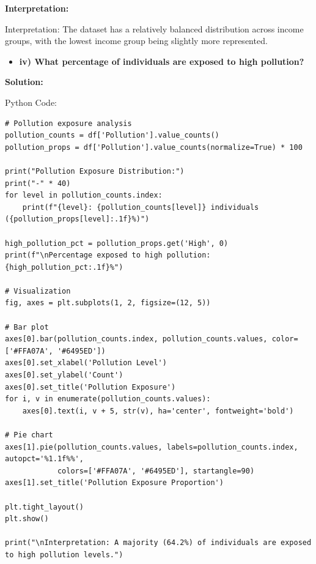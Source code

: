 \documentclass[12pt]{article}
\begin{document}
\vspace{0.3cm}

\textbf{Interpretation:}

Interpretation: The dataset has a relatively balanced distribution across income groups, with the lowest income group being slightly more represented.

\begin{itemize}
    \item\textbf{iv) What percentage of individuals are exposed to high pollution?}
\end{itemize}

{\large\textbf{Solution:}}\\

\vspace{0.1cm}

{\large{Python Code:}}

\vspace{0.2cm}

\begin{verbatim}
# Pollution exposure analysis
pollution_counts = df['Pollution'].value_counts()
pollution_props = df['Pollution'].value_counts(normalize=True) * 100

print("Pollution Exposure Distribution:")
print("-" * 40)
for level in pollution_counts.index:
    print(f"{level}: {pollution_counts[level]} individuals ({pollution_props[level]:.1f}%)")

high_pollution_pct = pollution_props.get('High', 0)
print(f"\nPercentage exposed to high pollution: {high_pollution_pct:.1f}%")

# Visualization
fig, axes = plt.subplots(1, 2, figsize=(12, 5))

# Bar plot
axes[0].bar(pollution_counts.index, pollution_counts.values, color=['#FFA07A', '#6495ED'])
axes[0].set_xlabel('Pollution Level')
axes[0].set_ylabel('Count')
axes[0].set_title('Pollution Exposure')
for i, v in enumerate(pollution_counts.values):
    axes[0].text(i, v + 5, str(v), ha='center', fontweight='bold')

# Pie chart
axes[1].pie(pollution_counts.values, labels=pollution_counts.index, autopct='%1.1f%%',
            colors=['#FFA07A', '#6495ED'], startangle=90)
axes[1].set_title('Pollution Exposure Proportion')

plt.tight_layout()
plt.show()

print("\nInterpretation: A majority (64.2%) of individuals are exposed to high pollution levels.")

\end{verbatim}
\end{document}
